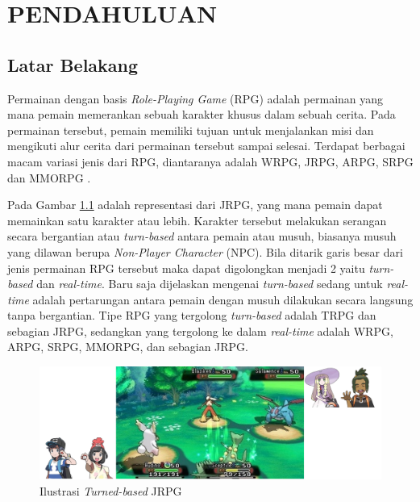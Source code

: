 \chapter{PENDAHULUAN}
\vspace{4ex}
\label{chap:chap1_introduction}

\section{Latar Belakang}
\vspace{1ex}

Permainan dengan basis \textit{Role-Playing Game} (RPG) adalah permainan yang mana pemain memerankan sebuah karakter khusus dalam sebuah cerita. Pada permainan tersebut, pemain memiliki tujuan untuk menjalankan misi dan mengikuti alur cerita dari permainan tersebut sampai selesai. Terdapat berbagai macam variasi jenis dari RPG, diantaranya adalah WRPG, JRPG, ARPG, SRPG dan MMORPG \citep{stenstrom2012}. 
\vspace{1ex}

Pada Gambar \ref{fig:rpg_turn_based} adalah representasi dari JRPG, yang mana pemain dapat memainkan satu karakter atau lebih. Karakter tersebut melakukan serangan secara bergantian atau \textit{turn-based} antara pemain atau musuh, biasanya musuh yang dilawan berupa \textit{Non-Player Character} (NPC). Bila ditarik garis besar dari jenis permainan RPG tersebut maka dapat digolongkan menjadi 2 yaitu \textit{turn-based} dan \textit{real-time}. Baru saja dijelaskan mengenai \textit{turn-based} sedang untuk \textit{real-time} adalah pertarungan antara pemain dengan musuh dilakukan secara langsung tanpa bergantian. Tipe RPG yang tergolong \textit{turn-based} adalah TRPG dan sebagian JRPG, sedangkan yang tergolong ke dalam \textit{real-time} adalah WRPG, ARPG, SRPG, MMORPG, dan sebagian JRPG.
\vspace{1ex}

\begin{figure} [!h] \centering
	\includegraphics[scale=0.45]{img/turn_based.png}
	\caption{Ilustrasi \textit{Turned-based} JRPG}
	\label{fig:rpg_turn_based}
\end{figure}

